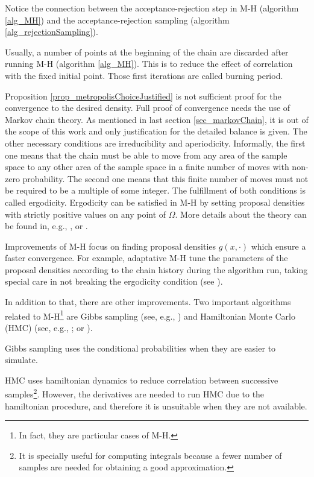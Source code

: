 \begin{remark}
  Notice the connection between the acceptance-rejection step in M-H (algorithm \ref{alg_MH}) and the acceptance-rejection sampling (algorithm \ref{alg_rejectionSampling}).
\end{remark}

\begin{remark}
  Usually, a number of points at the beginning of the chain are discarded after running M-H (algorithm \ref{alg_MH}). This is to reduce the effect of correlation with the fixed initial point. Those first iterations are called burning period.
\end{remark}

Proposition \ref{prop_metropolisChoiceJustified} is not sufficient proof for the convergence to the desired density. 
Full proof of convergence needs the use of Markov chain theory. As mentioned in last section \ref{sec_markovChain}, it is out of the scope of this work and only justification for the detailed balance is given. 
The other necessary conditions are irreducibility and aperiodicity. 
Informally, the first one means that the chain must be able to move from any area of the sample space to any other area of the sample space in a finite number of moves with non-zero probability. 
The second one means that this finite number of moves must not be required to be a multiple of some integer.
The fulfillment of both conditions is called ergodicity.
Ergodicity can be satisfied in M-H by setting proposal densities with strictly positive values on any point of $\Omega$.
More details about the theory can be found in, e.g., \textcite{robert2004}, \textcite{chib1995} or \textcite{smith1993}. 

Improvements of M-H focus on finding proposal densities $g(x,\cdot)$ which ensure a faster convergence. 
For example, adaptative M-H tune the parameters of the proposal densities according to the chain history during the algorithm run, taking special care in not breaking the ergodicity condition (see \cite{haario2001}).

In addition to that, there are other improvements. 
Two important algorithms related to M-H\footnote{In fact, they are particular cases of M-H.} are Gibbs sampling (see, e.g., \cite{casella1992}) and Hamiltonian Monte Carlo (HMC) (see, e.g., \cite{betancourt2018}; or \cite{brooks2011}).  

Gibbs sampling uses the conditional probabilities when they are easier to simulate.

HMC uses hamiltonian dynamics to reduce correlation between successive samples\footnote{It is specially useful for computing integrals because a fewer number of samples are needed for obtaining a good approximation.}.
However, the derivatives are needed to run HMC due to the hamiltonian procedure, and therefore it is unsuitable when they are not available. 


